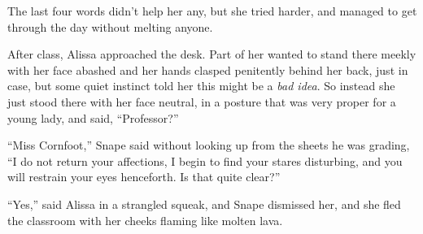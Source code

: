 The last four words didn't help her any, but she tried harder, and
managed to get through the day without melting anyone.

After class, Alissa approached the desk. Part of her wanted to stand
there meekly with her face abashed and her hands clasped penitently
behind her back, just in case, but some quiet instinct told her this
might be a \emph{bad idea}. So instead she just stood there with her
face neutral, in a posture that was very proper for a young lady, and
said, ``Professor?''

``Miss Cornfoot,'' Snape said without looking up from the sheets he was
grading, ``I do not return your affections, I begin to find your stares
disturbing, and you will restrain your eyes henceforth. Is that quite
clear?''

``Yes,'' said Alissa in a strangled squeak, and Snape dismissed her, and
she fled the classroom with her cheeks flaming like molten lava.
